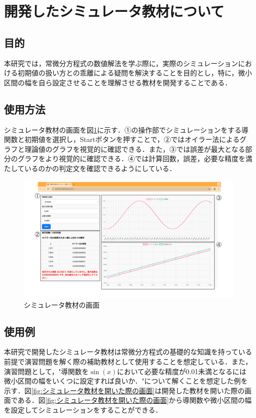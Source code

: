 \documentclass[a4paper, 12pt]{ltjsarticle}
\begin{document}
\section{開発したシミュレータ教材について}
\subsection{目的}
本研究では，常微分方程式の数値解法を学ぶ際に，実際のシミュレーションにおける初期値の扱い方との乖離による疑問を解決することを目的とし，特に，微小区間の幅を自ら設定させることを理解させる教材を開発することである．
\subsection{使用方法}
シミュレータ教材の画面を図\ref{fig:シミュレータ教材の画面}に示す．①の操作部でシミュレーションをする導関数と初期値を選択し，Startボタンを押すことで，②ではオイラー法によるグラフと理論値のグラフを視覚的に確認できる．また，③では誤差が最大となる部分のグラフをより視覚的に確認できる．④では計算回数，誤差，必要な精度を満たしているのかの判定文を確認できるようにしている．

\begin{figure}[h]
\begin{center}
\includegraphics[clip,width=\textwidth,keepaspectratio]{sim-image.pdf}
\end{center}
\caption{シミュレータ教材の画面}
\label{fig:シミュレータ教材の画面}
\end{figure}

\clearpage
\subsection{使用例}
本研究で開発したシミュレータ教材は常微分方程式の基礎的な知識を持っている前提で演習問題を解く際の補助教材として使用することを想定している．また，演習問題として，"導関数を$\sin(x)$において必要な精度が0.01未満となるには微小区間の幅をいくつに設定すれば良いか．"について解くことを想定した例を示す．図\ref{fig:シミュレータ教材を開いた際の画面}は開発した教材を開いた際の画面である．図\ref{fig:シミュレータ教材を開いた際の画面}から導関数や微小区間の幅を設定してシミュレーションをすることができる．
\end{document}

